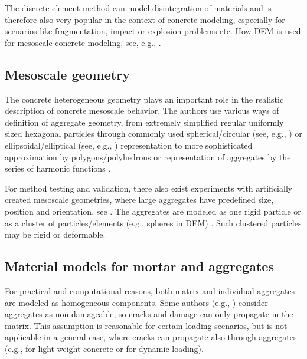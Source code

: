 The discrete element method can model disintegration of materials and is therefore also very popular in the context of concrete modeling, especially for scenarios like fragmentation, impact or explosion problems etc.
How DEM is used for mesoscale concrete modeling, see, e.g.,
\cite{%
	CambordeMariottiDonze2000a,%
	GrohKonietzkyWalterHerbst2011a,%
	HentzDonzeDaudeville2004a,%
	IbrahimbegovicDelaplace2003a,%
	TranDonzeMarin2011a,%
	WangLinGu2008a,%
	GrasslJirasek2010a,%
	Cusatis2001a,%
	LandisBolander2009a,%
	AsahinaLandisBolander2011a%
}.

\subsection{Mesoscale geometry}
The concrete heterogeneous geometry plays an important role in the realistic description of concrete meso\-scale behavior.
The authors use various ways of definition of aggregate geometry, from extremely simplified regular uniformly sized hexagonal particles through commonly used spherical/circular (see, e.g.,
\cite{%
	PedersenSimoneSluys2013a,%
	WangLinGu2008a,%
	WriggersMoftah2006,%
	ZhouHao2008a,%
	KimAlrub2011a,%
	GrasslJirasek2010a,%
	LandisBolander2009a,%
	AsahinaLandisBolander2011a%
}) or ellipsoidal/elliptical (see, e.g.,
\cite{%
	GrohKonietzkyWalterHerbst2011a,%
	HafnerEckardtLutherKonke2006a,%
	KimAlrub2011a%
}) representation to more sophisticated approximation by polygons/polyhedrons
\cite{%
	KwanWangChan1999b,%
	PedersenSimoneSluys2013a,%
	KimAlrub2011a,%
}
or representation of aggregates by the series of harmonic functions
\cite{%
	Garboczi2002a,%
	HafnerEckardtLutherKonke2006a,%
	Rypl2010a%
}.

For method testing and validation, there also exist experiments with artificially created mesoscale geometries, where large aggregates have predefined size, position and orientation, see
\cite{%
	TreggerCorrGrahambradyShah2006a,%
	BuyukozturkHearing1998%
}.
The aggregates are modeled as one rigid particle
\cite{%
	WangLinGu2008a,%
	LandisBolander2009a,%
	AsahinaLandisBolander2011a%
} or as a cluster of particles/elements (e.g., spheres in DEM)
\cite{%
	GrasslJirasek2010a,%
	GrohKonietzkyWalterHerbst2011a,%
	KimAlrub2011a,%
}.
Such clustered particles may be rigid or deformable.


\subsection{Material models for mortar and aggregates}
For practical and computational reasons, both matrix and individual aggregates are modeled as homogeneous components.
Some authors (e.g.,
\cite{%
	CaballeroWillamCarol2008a,%
	Cusatis2001a,%
	GrasslJirasek2010a,%
})
consider aggregates as non damageable, so cracks and damage can only propagate in the matrix.
This assumption is reasonable for certain loading scenarios, but is not applicable in a general case, where cracks can propagate also through aggregates (e.g., for light-weight concrete or for dynamic loading).

